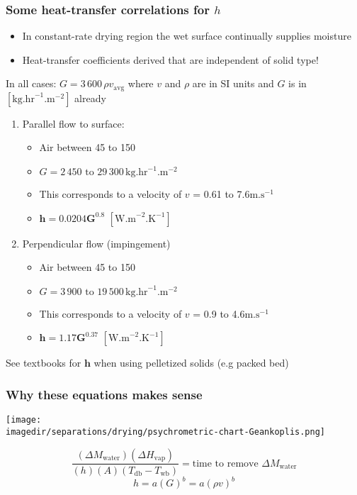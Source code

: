 \begin{frame}\frametitle{Some heat-transfer correlations for $h$}
	\begin{itemize}
		\item	In constant-rate drying region the wet surface continually supplies moisture
		\item	{\small Heat-transfer coefficients derived that are independent of solid type! }
	\end{itemize}

	\vspace{6pt}
	In all cases: $G = 3\,600\,\rho v_\text{avg}$ where $v$ and $\rho$ are in SI units and $G$ is in \([\text{kg.hr}^{-1}\text{.m}^{-2}]\) already
	\begin{enumerate}
		\item	Parallel flow to surface:
		\begin{itemize}
			\item	Air between 45 to 150\degC
			\item	$G = 2\,450\text{~to~}29\,300\, \text{kg.hr}^{-1}\text{.m}^{-2}$
			\item	This corresponds to a velocity of $v$ = 0.61 to 7.6$\text{m.s}^{-1}$
			\vspace{5pt}
			\item	$\mathbf{h = 0.0204G^{0.8}}\,\,[\text{W.m}^{-2}\text{.K}^{-1}]$ \hfill {}
		\end{itemize}
		\vspace{12pt}
		\item	Perpendicular flow (impingement)
		\begin{itemize}
			\item	Air between 45 to 150\degC
			\item	$G = 3\,900\text{~to~}19\,500\, \text{kg.hr}^{-1}\text{.m}^{-2}$
			\item	This corresponds to a velocity of $v$ = 0.9 to 4.6$\text{m.s}^{-1}$
			\vspace{5pt}
			\item	$\mathbf{h = 1.17G^{0.37}}\,\,[\text{W.m}^{-2}\text{.K}^{-1}]$
		\end{itemize}
	\end{enumerate}
	\vspace{12pt}
	See textbooks for $\mathbf h$ when using pelletized solids (e.g packed bed)
\end{frame}

\begin{frame}\frametitle{Why these equations makes sense}

	\begin{center}
		\texttt{[image: \\imagedir/separations/drying/psychrometric-chart-Geankoplis.png]}
	\end{center}
	\vspace{-6pt}
	\[\frac{(\Delta M_\text{water}) (\Delta H_\text{vap})}{(h)(A)(T_\text{db} - T_\text{wb})} = \text{time to remove $\Delta M_\text{water}$}
	\]
	\[h = a(G)^{b} = a(\rho v)^{b}\]
\end{frame}

